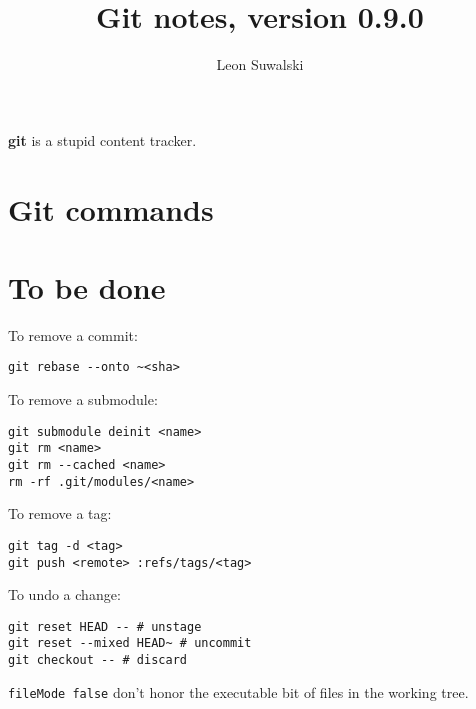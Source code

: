 \documentclass{charun}
\title{Git notes, version 0.9.0}
\author{Leon Suwalski}
\begin{document}
\begin{multicols*}{2}
\maketitle
\raggedright

\textbf{git} is a stupid content tracker.

\section{Git commands}




























\section{To be done}
To remove a commit:
\begin{verbatim}
git rebase --onto ~<sha>
\end{verbatim}

To remove a submodule:
\begin{verbatim}
git submodule deinit <name>
git rm <name>
git rm --cached <name>
rm -rf .git/modules/<name>
\end{verbatim}

To remove a tag:
\begin{verbatim}
git tag -d <tag>
git push <remote> :refs/tags/<tag>
\end{verbatim}

To undo a change:
\begin{verbatim}
git reset HEAD -- # unstage
git reset --mixed HEAD~ # uncommit
git checkout -- # discard
\end{verbatim}

\texttt{fileMode false} don't honor the executable bit of files in the working tree.


\end{multicols*}
\end{document}
